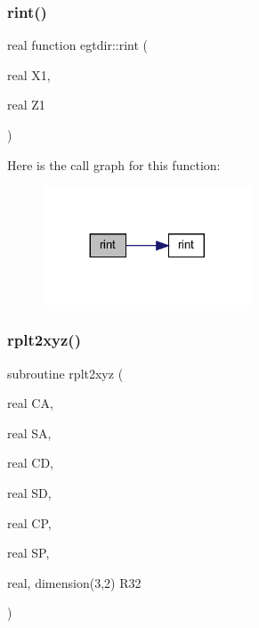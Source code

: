 \subsubsection{\texorpdfstring{rint()}{rint()}}
{\footnotesize\ttfamily real function egtdir\+::rint (\begin{DoxyParamCaption}\item[{real}]{X1,  }\item[{real}]{Z1 }\end{DoxyParamCaption})}

Here is the call graph for this function\+:\nopagebreak
\begin{figure}[H]
\begin{center}
\leavevmode
\includegraphics[width=176pt]{Leroi__c_8f90_a175215729f915283d0b8fb5dec72eb0a_cgraph}
\end{center}
\end{figure}
\mbox{\label{Leroi__c_8f90_a8ec0c93946d1a3d78ce1cabd3de6558d}} 
\subsubsection{\texorpdfstring{rplt2xyz()}{rplt2xyz()}}
{\footnotesize\ttfamily subroutine rplt2xyz (\begin{DoxyParamCaption}\item[{real}]{CA,  }\item[{real}]{SA,  }\item[{real}]{CD,  }\item[{real}]{SD,  }\item[{real}]{CP,  }\item[{real}]{SP,  }\item[{real, dimension(3,2)}]{R32 }\end{DoxyParamCaption})}

\mbox{\label{Leroi__c_8f90_af139b1e21e0c1e77a354000840adee66}} 
